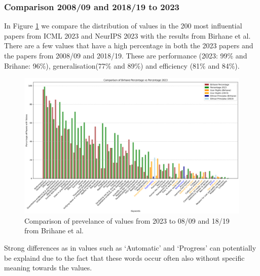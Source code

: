 \documentclass{article}
\begin{document}
\subsubsection{Comparison 2008/09 and 2018/19 to 2023}
In Figure \ref{fig:percentage_comparison_years} we compare the distribution of values in the 200 most influential papers from ICML 2023 and NeurIPS 2023 with the results from Birhane et al.
There are a few values that have a high percentage in both the 2023 papers and the papers from 2008/09 and 2018/19. 
These are performance (2023: 99\% and Brihane: 96\%), generalisation(77\% and 89\%) and efficiency (81\% and 84\%). 
\begin{figure}[H]
    \centering
    \includegraphics[width=\textwidth]{../plots/percentage_comparison_brihane.png}
    \caption{Comparison of prevelance of values from 2023 to 08/09 and 18/19 from Brihane et al.}
    \label{fig:percentage_comparison_years}
\end{figure}
Strong differences as in values such as `Automatic' and `Progress' can potentially be explaind due to the fact that these 
words occur often also without specific meaning towards the values. 
\end{document}
